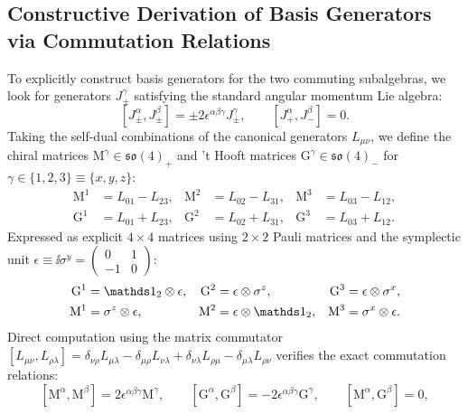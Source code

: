 \subsection{Constructive Derivation of Basis Generators via Commutation Relations}
To explicitly construct basis generators for the two commuting subalgebras, we look for generators $J_\pm^\gamma$ satisfying the standard angular momentum Lie algebra:
\begin{equation}
\label{eq:m1_1_abstract_su2_comm}
[J_\pm^\alpha, J_\pm^\beta] = \pm 2\epsilon^{\alpha\beta\gamma} J_\pm^\gamma, \qquad [J_+^\alpha, J_-^\beta] = 0.
\end{equation}
Taking the self-dual combinations of the canonical generators $L_{\mu\nu}$, we define the chiral matrices $\mathrm{M}^\gamma \in \mathfrak{so}(4)_+$ and 't Hooft matrices $\mathrm{G}^\gamma \in \mathfrak{so}(4)_-$ for $\gamma \in \{1, 2, 3\} \equiv \{x, y, z\}$:
\begin{align}
\label{eq:m1_1_M_from_L}
\mathrm{M}^1 &= L_{01} - L_{23}, & \mathrm{M}^2 &= L_{02} - L_{31}, & \mathrm{M}^3 &= L_{03} - L_{12}, \\
\label{eq:m1_1_G_from_L}
\mathrm{G}^1 &= L_{01} + L_{23}, & \mathrm{G}^2 &= L_{02} + L_{31}, & \mathrm{G}^3 &= L_{03} + L_{12}.
\end{align}
Expressed as explicit $4 \times 4$ matrices using $2 \times 2$ Pauli matrices and the symplectic unit $\epsilon \equiv \ii \sigma^y = \begin{pmatrix} 0 & 1 \\ -1 & 0 \end{pmatrix}$:
\begin{align}
\label{eq:m1_1_G_matrices}
\mathrm{G}^1 &= \Id_2 \otimes \epsilon, & \mathrm{G}^2 &= \epsilon \otimes \sigma^z, & \mathrm{G}^3 &= \epsilon \otimes \sigma^x, \\
\label{eq:m1_1_M_matrices}
\mathrm{M}^1 &= \sigma^z \otimes \epsilon, & \mathrm{M}^2 &= \epsilon \otimes \Id_2, & \mathrm{M}^3 &= \sigma^x \otimes \epsilon.
\end{align}
Direct computation using the matrix commutator $[L_{\mu\nu}, L_{\rho\lambda}] = \delta_{\nu\rho} L_{\mu\lambda} - \delta_{\mu\rho} L_{\nu\lambda} + \delta_{\nu\lambda} L_{\rho\mu} - \delta_{\mu\lambda} L_{\rho\nu}$ verifies the exact commutation relations:
\begin{equation}
\label{eq:m1_1_matrix_commutators}
[\mathrm{M}^\alpha, \mathrm{M}^\beta] = 2 \epsilon^{\alpha\beta\gamma} \mathrm{M}^\gamma, \qquad [\mathrm{G}^\alpha, \mathrm{G}^\beta] = -2 \epsilon^{\alpha\beta\gamma} \mathrm{G}^\gamma, \qquad [\mathrm{M}^\alpha, \mathrm{G}^\beta] = 0,
\end{equation}
